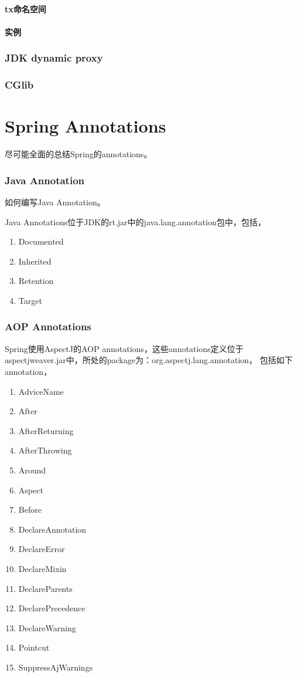 \documentclass[a4paper,11pt]{article}
\begin{document}
\subsection[tx命名空间]{tx命名空间}
\subsection[实例]{实例}


\section[JDK dynamic proxy]{JDK dynamic proxy}

\section[CGlib]{CGlib}



\part[Spring Annotations]{Spring Annotations}
尽可能全面的总结Spring的annotations。

\section[Java Annotation]{Java Annotation}
如何编写Java Annotation。

Java Annotations位于JDK的rt.jar中的java.lang.annotation包中，包括，
\begin{enumerate}
\item Documented
\item Inherited
\item Retention
\item Target
\end{enumerate}

\section[AOP Annotations]{AOP Annotations}
Spring使用AspectJ的AOP annotations，这些annotations定义位于
aspectjweaver.jar中，所处的package为：org.aspectj.lang.annotation，
包括如下annotation，
\begin{enumerate}
\item AdviceName
\item After
\item AfterReturning
\item AfterThrowing
\item Around
\item Aspect
\item Before
\item DeclareAnnotation
\item DeclareError
\item DeclareMixin
\item DeclareParents
\item DeclarePrecedence
\item DeclareWarning
\item Pointcut
\item SuppressAjWarnings
\end{enumerate}
\end{document}
